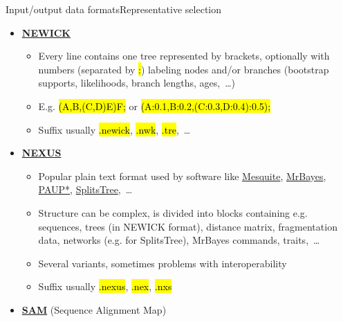 \documentclass[compress, ucs, xelatex, 11pt, xcolor=svgnames,
  hyperref={
    bookmarks=true,
    unicode=true,
    colorlinks=true,
    pdftitle={Molecular data in R},
    plainpages=false,
    pdfauthor={Vojtech Zeisek},
    pdfsubject={Course about phylogeny and evolution in R},
    pdfcreator={XeLaTeX},
    pdfkeywords={R, evolution, phylogeny, molecular data},
    linkcolor=Tomato,
    anchorcolor=SaddleBrown,
    citecolor=Goldenrod,
    filecolor=DarkMagenta,
    menucolor=Sienna,
    urlcolor=DarkTurquoise,
    pdftex},
  url={hyphens, lowtilde} %
  ]{beamer}
\renewcommand{\texttt}[1]{\hl{\ttfamily #1}}
\begin{document}
\begin{frame}[allowframebreaks]{Input/output data formats}{Representative selection}
\begin{itemize}
\begin{itemize}
      \item Every record consists of \textbf{4~lines}: (\textbf{1}) sequence ID (with possible description) starting with \texttt{@}, (\textbf{2}) the sequence (\texttt{ATCG...}), (\textbf{3}) \texttt{+} optionally followed by the same ID as line 1, and (\textbf{4}) quality values for nucleotides from line 2
      \item Common format for output of modern high throughput sequencing machines (e.g. Illumina)
      \item Commonly compressed by \texttt{gzip} (\texttt{*.gz}), sometimes by other compression application
      \item Suffix usually \texttt{*.fastq}, \texttt{*.fq}, \texttt{*.fastq.gz}, \texttt{*.fq.gz},~\ldots
    \end{itemize}
    \item \href{https://en.wikipedia.org/wiki/Newick_format}{\textbf{NEWICK}}
    \begin{itemize}
      \item Every line contains one tree represented by brackets, optionally with numbers (separated by \texttt{:}) labeling nodes and/or branches (bootstrap supports, likelihoods, branch lengths, ages,~\ldots)
      \item E.g. \texttt{(A,B,(C,D)E)F;} or \texttt{(A:0.1,B:0.2,(C:0.3,D:0.4):0.5);}
      \item Suffix usually \texttt{*.newick}, \texttt{*.nwk}, \texttt{*.tre},~\ldots
    \end{itemize}
    \item \href{https://en.wikipedia.org/wiki/Nexus_file}{\textbf{NEXUS}}
    \begin{itemize}
      \item Popular plain text format used by software like \href{http://mesquiteproject.org/}{Mesquite}, \href{http://mrbayes.sourceforge.net/}{MrBayes}, \href{http://paup.sc.fsu.edu/}{PAUP*}, \href{http://www.splitstree.org/}{SplitsTree},~\ldots
      \item Structure can be complex, is divided into blocks containing e.g. sequences, trees (in NEWICK format), distance matrix, fragmentation data, networks (e.g. for SplitsTree), MrBayes commands, traits,~\ldots
      \item Several variants, sometimes problems with interoperability
      \item Suffix usually \texttt{*.nexus}, \texttt{*.nex}, \texttt{*.nxs}
    \end{itemize}
    \item \href{https://en.wikipedia.org/wiki/SAM_(file_format)}{\textbf{SAM}} (Sequence Alignment Map)

\end{itemize}
\end{frame}
\end{document}
